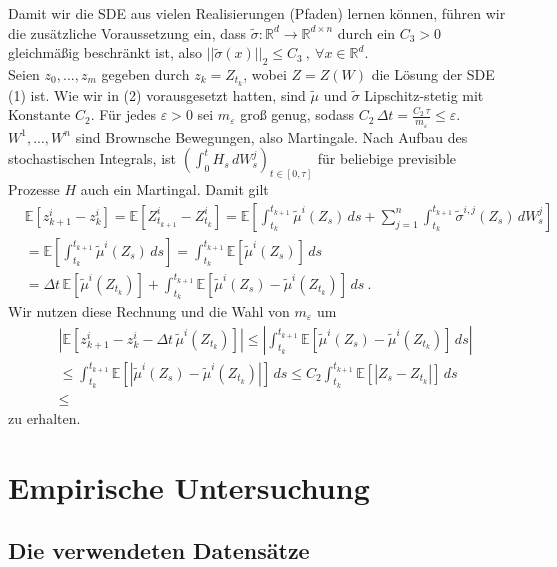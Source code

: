 \documentclass[12pt]{article}
\newcommand{\E}{\mathbb{E}}
\newcommand{\R}{\mathbb{R}}
\newcommand{\tmu}{\widetilde{\mu}}
\newcommand{\tsig}{\widetilde{\sigma}}
\begin{document}
	\newpage
	\noindent
	
	Damit wir die SDE aus vielen Realisierungen (Pfaden) lernen können, führen wir die zusätzliche Voraussetzung ein, dass $\tsig : \R^d \rightarrow \R^{d \times n}$ durch ein $C_3 > 0$ gleichmäßig beschränkt ist, also $||\tsig(x)||_2 \leq C_3 \ , \ \forall x \in \R^d$.\\
	Seien $z_0,...,z_m$ gegeben durch $z_k = Z_{t_k}$, wobei $Z = Z(W)$ die Lösung der SDE (1) ist. Wie wir in (2) vorausgesetzt hatten, sind $\tmu$ und $\tsig$ Lipschitz-stetig mit Konstante $C_2$. Für jedes $\varepsilon > 0$ sei $m_\varepsilon$ groß genug, sodass $C_2 \, \Delta t = \frac{C_2 \, \tau}{m_\varepsilon} \leq \varepsilon$.\\
	$W^1,...,W^n$ sind Brownsche Bewegungen, also Martingale. Nach Aufbau des stochastischen Integrals, ist $\left(\int_0^t H_s \, dW^j_s \right)_{t \in [0,\tau]}$ für beliebige previsible Prozesse $H$ auch ein Martingal. Damit gilt
	\begin{align*}
		& \E[z^i_{k+1}-z^i_k] = \E[Z^i_{t_{k+1}}-Z^i_{t_k}] = \E\left[ \int_{t_k}^{t_{k+1}} \tmu^i(Z_s) \, ds + \sum\limits_{j=1}^n \int_{t_k}^{t_{k+1}} \tsig^{i,j}(Z_s) \, dW^j_s \right]\\
		& = \E\left[ \int_{t_k}^{t_{k+1}} \tmu^i(Z_s) \, ds \right] = \int_{t_k}^{t_{k+1}} \E[\tmu^i(Z_s)] \, ds\\
		& = \Delta t \, \E[\tmu^i(Z_{t_k})] + \int_{t_k}^{t_{k+1}} \E[\tmu^i(Z_s)-\tmu^i(Z_{t_k})] \, ds \ .
	\end{align*}
	Wir nutzen diese Rechnung und die Wahl von $m_\varepsilon$ um
	\begin{align*}
		& \left| \E[z^i_{k+1}-z^i_k - \Delta t \, \tmu^i(Z_{t_k})] \right| \leq \left| \int_{t_k}^{t_{k+1}} \E[\tmu^i(Z_s)-\tmu^i(Z_{t_k})] \, ds \right|\\
		& \leq \int_{t_k}^{t_{k+1}} \E[|\tmu^i(Z_s)-\tmu^i(Z_{t_k})|] \, ds \leq C_2 \int_{t_k}^{t_{k+1}} \E[|Z_s-Z_{t_k}|] \, ds\\
		& \leq 
	\end{align*}
	zu erhalten.
	
	
	
	
	\newpage
	\section[Empirische Untersuchung]{Empirische Untersuchung}
	\subsection[Datensätze]{Die verwendeten Datensätze}
\end{document}

